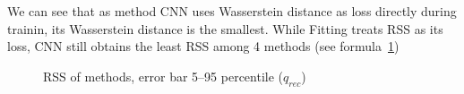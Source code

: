 We can see that as method CNN uses Wasserstein distance as loss directly during trainin, its Wasserstein distance is the smallest. While Fitting treats RSS as its loss, CNN still obtains the least RSS among 4 methods (see formula~\ref{fig:rsssummary})

\begin{figure}[H]
    \centering
    \resizebox{\textwidth}{!}{}
    \caption{\label{fig:rsssummary} RSS of methods, error bar 5--95 percentile ($q_{rec}$)}
\end{figure}

